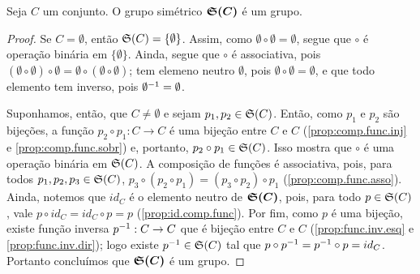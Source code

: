 \begin{prop}
	Seja $C$ um conjunto. O grupo simétrico $\bm{\mathfrak{S}(C)}$ é um grupo.
\end{prop}
\begin{proof}
	Se $C=\emptyset$, então $\mathfrak{S}(C)=\{\emptyset\}$. Assim, como $\emptyset \circ \emptyset = \emptyset$, segue que $\circ$ é operação binária em $\{\emptyset\}$. Ainda, segue que $\circ$ é associativa, pois $(\emptyset \circ \emptyset) \circ \emptyset = \emptyset \circ (\emptyset \circ \emptyset)$; tem elemeno neutro $\emptyset$, pois $\emptyset \circ \emptyset = \emptyset$, e que todo elemento tem inverso, pois $\emptyset^{-1} = \emptyset$.

	Suponhamos, então, que $C \neq \emptyset$ e sejam $p_1,p_2 \in \mathfrak{S}(C)$. Então, como $p_1$ e $p_2$ são bijeções, a função $p_2 \circ p_1: C \to C$ é uma bijeção entre $C$ e $C$ (\ref{prop:comp.func.inj} e \ref{prop:comp.func.sobr}) e, portanto, $p_2 \circ p_1 \in \mathfrak{S}(C)$. Isso mostra que $\circ$ é uma operação binária em $\mathfrak{S}(C)$. A composição de funções é associativa, pois, para todos $p_1,p_2,p_3 \in \mathfrak{S}(C)$, $p_3 \circ (p_2 \circ p_1) = (p_3 \circ p_2) \circ p_1$ (\ref{prop:comp.func.asso}). Ainda, notemos que $id_C$ é o elemento neutro de $\bm{\mathfrak{S}(C)}$, pois, para todo $p \in \mathfrak{S}(C)$, vale $p \circ id_C = id_C \circ p = p$ (\ref{prop:id.comp.func}). Por fim, como $p$ é uma bijeção, existe função inversa $p^{-1}: C \to C$ que é bijeção entre $C$ e $C$ (\ref{prop:func.inv.esq} e \ref{prop:func.inv.dir}); logo existe $p^{-1} \in \mathfrak{S}(C)$ tal que $p \circ p^{-1} = p^{-1} \circ p = id_C$. Portanto concluímos que $\bm{\mathfrak{S}(C)}$ é um grupo.
\end{proof}

